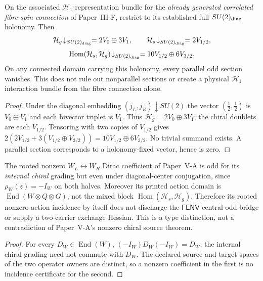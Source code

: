 \documentclass[12pt,a4paper]{article}
\begin{document}
\begin{theorem}
\label{p2b:thm:v264-no-parallel-odd}
On the associated $\mathcal H_1$ representation bundle for the
\emph{already generated correlated fibre-spin connection} of
Paper~III-F, restrict to its established full $SU(2)_{\rm diag}$
holonomy. Then
\[
\mathcal H_g\!\downarrow_{SU(2)_{\rm diag}}
 =2V_0\oplus3V_1,
\qquad
\mathcal H_s\!\downarrow_{SU(2)_{\rm diag}}=2V_{1/2},
\]
\[
 \operatorname{Hom}(\mathcal H_s,\mathcal H_g)
 \!\downarrow_{SU(2)_{\rm diag}}
 =10V_{1/2}\oplus6V_{3/2}.
\]
On any connected domain carrying this holonomy, every parallel odd
section vanishes. This does not rule out nonparallel sections or
create a physical $\mathcal H_1$ interaction bundle from the
fibre connection alone.
\end{theorem}
\begin{proof}
Under the diagonal embedding $(j_L,j_R)\downarrow SU(2)$ the vector
$(\tfrac12,\tfrac12)$ is $V_0\oplus V_1$ and each bivector triplet
is $V_1$. Thus $\mathcal H_g=2V_0\oplus3V_1$;
the chiral doublets are each $V_{1/2}$. Tensoring with two copies
of $V_{1/2}$ gives $2(2V_{1/2}+3(V_{1/2}\oplus V_{3/2}))
=10V_{1/2}\oplus6V_{3/2}$. No trivial summand exists.
A parallel section corresponds to a holonomy-fixed vector, hence is zero.
\end{proof}

\begin{proposition}
\label{p2b:prop:v264-chiral-central-distinction}
The rooted nonzero $W_L\leftrightarrow W_R$ Dirac coefficient of
Paper~V-A is odd for its \emph{internal chiral} grading but even
under diagonal-center conjugation, since
$\rho_W(z)=-I_W$ on both halves. Moreover its printed action domain
is $\operatorname{End}(W\otimes Q\otimes G)$, not the mixed block
$\operatorname{Hom}(\mathcal H_s,\mathcal H_g)$.
Therefore its rooted nonzero action incidence by itself does not
discharge the $\mathsf{FENV}$ central-odd bridge or supply a two-carrier
exchange Hessian. This is a type distinction, not a contradiction of
Paper~V-A's nonzero chiral source theorem.
\end{proposition}
\begin{proof}
For every $D_W\in\operatorname{End}(W)$,
$(-I_W)D_W(-I_W)=D_W$; the internal chiral grading need not commute
with $D_W$. The declared source and target spaces of the two
operator owners are distinct, so a nonzero coefficient in the first
is no incidence certificate for the second.
\end{proof}
\end{document}
